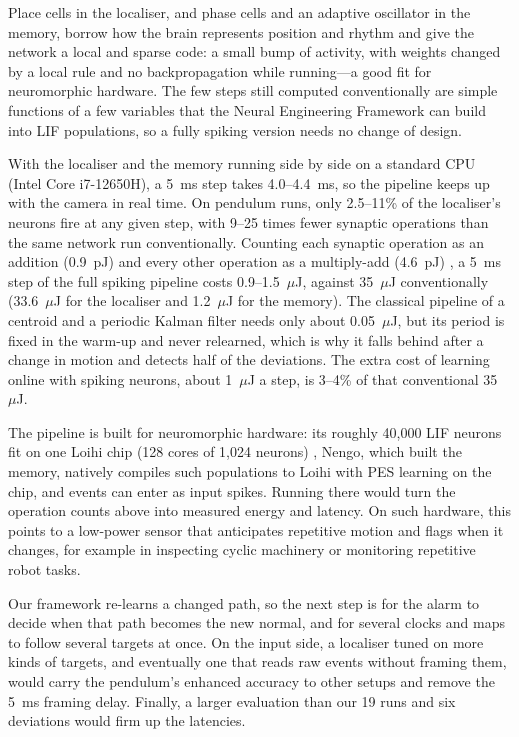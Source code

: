 \documentclass[conference]{IEEEtran}
\begin{document}
Place cells in the localiser, and phase cells and an adaptive oscillator in the memory, borrow how the brain represents position and rhythm and give the network a local and sparse code: a small bump of activity, with weights changed by a local rule and no backpropagation while running---a good fit for neuromorphic hardware. The few steps still computed conventionally are simple functions of a few variables that the Neural Engineering Framework can build into LIF populations, so a fully spiking version needs no change of design.

With the localiser and the memory running side by side on a standard CPU (Intel Core i7-12650H), a 5~ms step takes 4.0--4.4~ms, so the pipeline keeps up with the camera in real time. On pendulum runs, only 2.5--11\% of the localiser's neurons fire at any given step, with 9--25 times fewer synaptic operations than the same network run conventionally. Counting each synaptic operation as an addition (0.9~pJ) and every other operation as a multiply-add (4.6~pJ) \cite{Horowitz20141}, a 5~ms step of the full spiking pipeline costs 0.9--1.5~$\mu$J, against 35~$\mu$J conventionally (33.6~$\mu$J for the localiser and 1.2~$\mu$J for the memory). The classical pipeline of a centroid and a periodic Kalman filter needs only about 0.05~$\mu$J, but its period is fixed in the warm-up and never relearned, which is why it falls behind after a change in motion and detects half of the deviations. The extra cost of learning online with spiking neurons, about 1~$\mu$J a step, is 3--4\% of that conventional 35~$\mu$J.

The pipeline is built for neuromorphic hardware: its roughly 40,000 LIF neurons fit on one Loihi chip (128 cores of 1,024 neurons) \cite{Davies2018Loihi}, Nengo, which built the memory, natively compiles such populations to Loihi with PES learning on the chip,  and events can enter as input spikes. Running there would turn the operation counts above into measured energy and latency. On such hardware, this points to a low-power sensor that anticipates repetitive motion and flags when it changes, for example in inspecting cyclic machinery or monitoring repetitive robot tasks.

Our framework re-learns a changed path, so the next step is for the alarm to decide when that path becomes the new normal, and for several clocks and maps to follow several targets at once. On the input side, a localiser tuned on more kinds of targets, and eventually one that reads raw events without framing them, would carry the pendulum's enhanced accuracy to other setups and remove the 5~ms framing delay. Finally, a larger evaluation than our 19 runs and six deviations would firm up the latencies.
\end{document}
